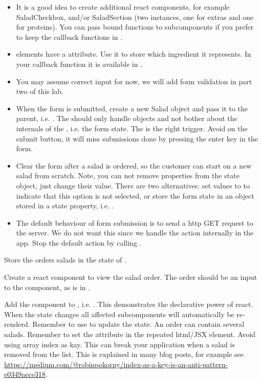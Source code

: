 \documentclass[fleqn, article, a4paper]{memoir}
\begin{document}
\begin{Assignments}
\begin{itemize}
  \item It is a good idea to create additional react components, for example SaladCheckbox, and/or SaladSection (two instances, one for extras and one for proteins). You can pass bound functions to subcomponents if you prefer to keep the callback functions in .
  \item {} elements have a  attribute. Use it to store which ingredient it represents. In your callback function it is available in .
  \item You may assume correct input for now, we will add form validation in part two of this lab.
  \item When the form is submitted, create a new Salad object and pass it to the parent, i.e. . The  should only handle  objects and not bother about the internals of the , i.e. the form state. The  is the right trigger. Avoid  on the submit button, it will miss submissions done by pressing the enter key in the form.
  \item Clear the form after a salad is ordered, so the customer can start on a new salad from scratch. Note, you can not remove properties from the state object, just change their value. There are two alternatives: set values to  to indicate that this option is not selected, or store the form state in an object stored in a state property, i.e. .
  \item The default behaviour of form submission is to send a http GET request to the server. We do not want this since we handle the action internally in the app. Stop the default action by calling .
\end{itemize}

\item Store the orders salads in the state of .

\item Create a react component to view the salad order. The order should be an input to the component, as  is in .

\item Add the  component to , i.e. . This demonstrates the declarative power of react. When the state changes all affected subcomponents will automatically be re-renderd. Remember to use  to update the state.
\newline
\newline
An order can contain several salads. Remember to set the  attribute in the repeated html/JSX element. Avoid using array index as kay. This can break your application when a salad is removed from the list. This is explained in many blog posts, for example see \url{https://medium.com/@robinpokorny/index-as-a-key-is-an-anti-pattern-e0349aece318}.


\end{Assignments}
\end{document}
